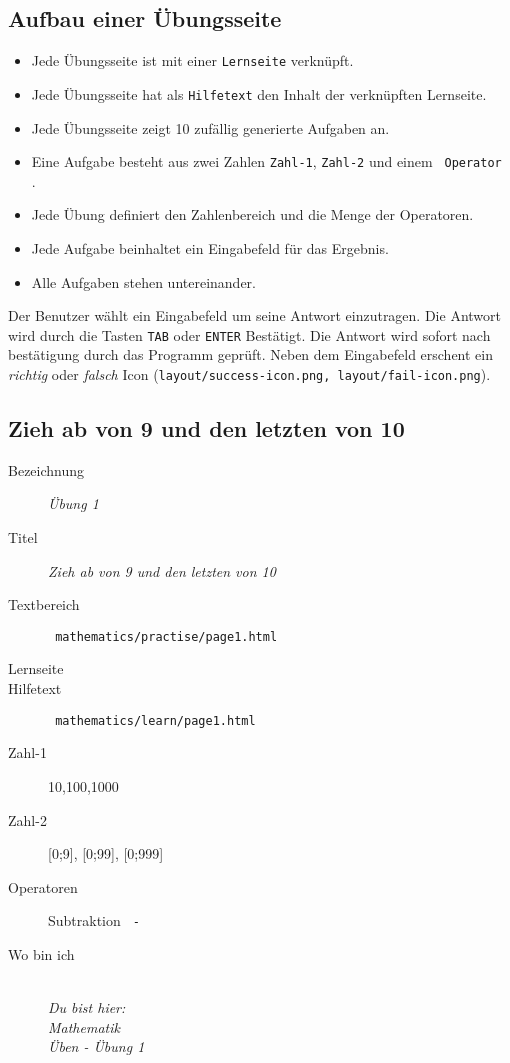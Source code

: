 \subsection{ Aufbau einer Übungsseite }
\label{cha:math-practise-structure}
\begin{itemize}
  \item Jede Übungsseite ist mit einer \texttt{Lernseite} verknüpft.
  \item Jede Übungsseite hat als \texttt{Hilfetext} den Inhalt der verknüpften Lernseite.
  \item Jede Übungsseite zeigt 10 zufällig generierte Aufgaben an.
  \item Eine Aufgabe besteht aus zwei Zahlen \texttt{Zahl-1}, \texttt{Zahl-2} und einem \texttt{ Operator }.
  \item Jede Übung definiert den Zahlenbereich und die Menge der Operatoren.
  \item Jede Aufgabe beinhaltet ein Eingabefeld für das Ergebnis.
  \item Alle Aufgaben stehen untereinander.
\end{itemize}

Der Benutzer wählt ein Eingabefeld um seine Antwort einzutragen. Die Antwort wird durch die Tasten \texttt{TAB} oder \texttt{ENTER} Bestätigt. Die Antwort wird sofort nach bestätigung durch das Programm geprüft. Neben dem Eingabefeld erschent ein \emph{richtig} oder \emph{falsch} Icon (\texttt{layout/success-icon.png, layout/fail-icon.png}).



\subsection{ Zieh ab von 9 und den letzten von 10 }
\label{cha:math-practise-page1}
\begin{description}
  \item[Bezeichnung] \emph{ Übung 1 }
  \item[Titel] \emph{ Zieh ab von 9 und den letzten von 10 }
  \item[Textbereich] \texttt{ mathematics/practise/page1.html }
  \item[Lernseite] 
  \item[Hilfetext] \texttt{ mathematics/learn/page1.html }
  \item[Zahl-1] {10,100,1000}
  \item[Zahl-2] {[0;9], [0;99], [0;999]}
  \item[Operatoren] Subtraktion \texttt{ - }
  \item[Wo bin ich] \emph{\\Du bist hier:\\Mathematik\\Üben - Übung 1}
\end{description}



